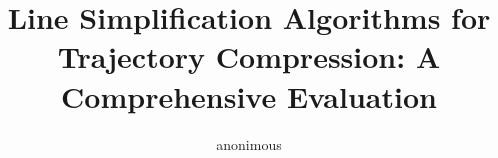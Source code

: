 \documentclass[acmsmall]{acmart}
\begin{document}
\title{Line Simplification Algorithms for Trajectory Compression: A Comprehensive Evaluation}

%
%
%
%
%



\author{anonimous}
\end{document}
